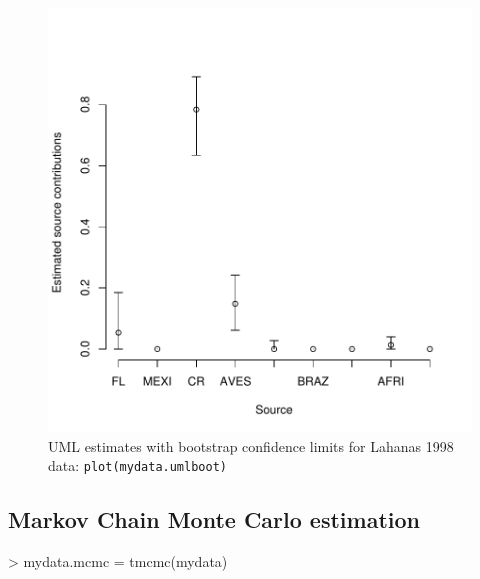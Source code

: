\documentclass[11pt]{article}
\newcommand{\code}[1]{{\tt #1}}
\begin{document}
\begin{figure}
\includegraphics{mixstock-022}
\caption{UML estimates with bootstrap confidence limits for Lahanas 1998 data: \code{plot(mydata.umlboot)}}
\label{fig:umlboot}
\end{figure}

\subsection{Markov Chain Monte Carlo estimation}
\begin{Schunk}
\begin{Sinput}
> mydata.mcmc = tmcmc(mydata)
\end{Sinput}
\end{Schunk}
\end{document}
